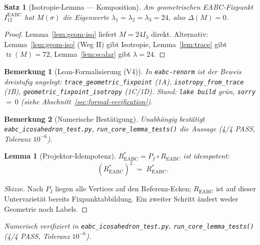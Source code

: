\documentclass[11pt,a4paper]{article}
\newtheorem{theorem}{Satz}
\newtheorem{remark}{Bemerkung}
\newtheorem{lemma}{Lemma}
\begin{document}
\begin{theorem}[Isotropie-Lemma — Komposition]
\label{thm:isotropy}
Am geometrischen EABC-Fixpunkt $I_{12}^{\mathrm{EABC}}$ hat $M(\sigma)$ die
Eigenwerte $\lambda_1=\lambda_2=\lambda_3=24$, also $\Delta(M)=0$.
\end{theorem}

\begin{proof}
Lemma~\ref{lem:geom-iso} liefert $M=24I_3$ direkt.
Alternativ: Lemma~\ref{lem:geom-iso} (Weg II) gibt Isotropie,
Lemma~\ref{lem:trace} gibt $\operatorname{tr}(M)=72$,
Lemma~\ref{lem:scalar} gibt $\lambda=24$.
\end{proof}

\begin{remark}[Lean-Formalisierung (V4)]
In \texttt{eabc-renorm} ist der Beweis dreistufig angelegt:
\texttt{trace\_geometric\_fixpoint} (1A),
\texttt{isotropy\_from\_trace} (1B),
\texttt{geometric\_fixpoint\_isotropy} (1C/1D).
Stand: \texttt{lake build} grün, \texttt{sorry}\,$=\,0$
(siehe Abschnitt~\ref{sec:formal-verification}).
\end{remark}

\begin{remark}[Numerische Bestätigung]
Unabhängig bestätigt \texttt{eabc\_icosahedron\_test.py},
\texttt{run\_core\_lemma\_tests()} die Aussage (4/4 PASS, Toleranz $10^{-6}$).
\end{remark}

\begin{lemma}[Projektor-Idempotenz]
\label{lem:idempotence}
$R^*_{\mathrm{EABC}} = P_I \circ R_{\mathrm{EABC}}$ ist idempotent:
\[
  (R^*_{\mathrm{EABC}})^2 \;=\; R^*_{\mathrm{EABC}}.
\]
\end{lemma}

\begin{proof}[Skizze]
Nach $P_I$ liegen alle Vertices auf den Referenz-Ecken; $R_{\mathrm{EABC}}$ ist
auf dieser Untervarietät bereits Fixpunktabbildung. Ein zweiter Schritt ändert
weder Geometrie noch Labels.
\end{proof}

\smallskip\noindent
\textit{Numerisch verifiziert in \texttt{eabc\_icosahedron\_test.py},
\texttt{run\_core\_lemma\_tests()} (4/4 PASS, Toleranz $10^{-6}$).}
\end{document}
